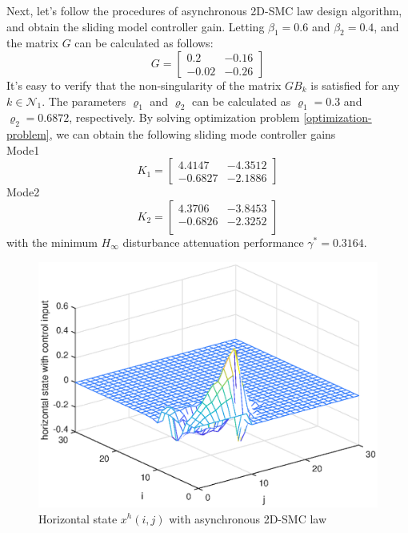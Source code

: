 \documentclass[conference]{IEEEtran}
\begin{document}
Next, let's follow the procedures of asynchronous 2D-SMC law design algorithm, and obtain the sliding model controller gain. 
Letting $\beta_{1}=0.6$ and $\beta_{2}=0.4$, and the  matrix $G$ can be calculated as follows:
\begin{equation*}
G=\begin{bmatrix}
0.2&-0.16\\
-0.02&-0.26
\end{bmatrix}
\end{equation*}
It's easy to verify that the non-singularity of the matrix $GB_{k}$ is satisfied for any $k\in\mathcal{N}_{1}$. The parameters $\varrho_{1}$ and $\varrho_{2}$ can be calculated as $\varrho_{1}=0.3$ and $\varrho_{2}=0.6872$, respectively. By solving optimization problem \eqref{optimization-problem}, we can obtain the following sliding mode controller gains\\
Mode1
\begin{equation*}
 	K_{1}=\begin{bmatrix}
 	4.4147  & -4.3512\\
 	-0.6827 &  -2.1886
 	\end{bmatrix}
\end{equation*}
Mode2
\begin{equation*}
K_{2} = 	\begin{bmatrix}
 4.3706  & -3.8453 \\
-0.6826 &  -2.3252 \\
\end{bmatrix}
\end{equation*}
with the minimum $H_{\infty}$ disturbance attenuation performance $\gamma^{*}=0.3164$. 
\begin{figure}[!htb]
	\centering\includegraphics[scale=0.6]{./simulations/h-state-with-force.eps}
	\caption{Horizontal state $x^{h}(i,j)$ with  asynchronous 2D-SMC law}
	\label{fig5}
\end{figure}
\end{document}

